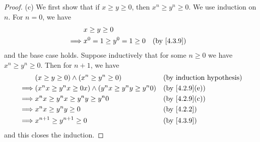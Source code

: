 \begin{proof}{(c)}
  We first show that if \(x \geq y \geq 0\), then \(x^n \geq y^n \geq 0\).
  We use induction on \(n\).
  For \(n = 0\), we have
  \begin{align*}
             & x \geq y \geq 0                                           \\
    \implies & x^0 = 1 \geq y^0 = 1 \geq 0 &  & \text{(by \cref{4.3.9})}
  \end{align*}
  and the base case holds.
  Suppose inductively that for some \(n \geq 0\) we have \(x^n \geq y^n \geq 0\).
  Then for \(n + 1\), we have
  \begin{align*}
             & (x \geq y \geq 0) \land (x^n \geq y^n \geq 0)                  &  & \text{(by induction hypothesis)} \\
    \implies & (x^n x \geq y^n x \geq 0x) \land (y^n x \geq y^n y \geq y^n 0) &  & \text{(by \cref{4.2.9}(e))}      \\
    \implies & x^n x \geq y^n x \geq y^n y \geq y^n 0                         &  & \text{(by \cref{4.2.9}(c))}      \\
    \implies & x^n x \geq y^n y \geq 0                                        &  & \text{(by \cref{4.2.2})}         \\
    \implies & x^{n + 1} \geq y^{n + 1} \geq 0                                &  & \text{(by \cref{4.3.9})}
  \end{align*}
  and this closes the induction.


\end{proof}
